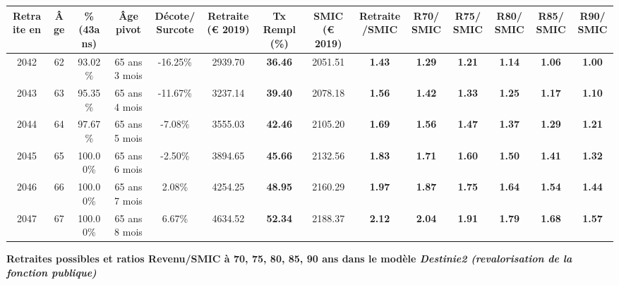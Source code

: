 \begin{adjustbox}{max width=\textwidth} 
\begin{tabular}[htb]{|c|c||c|c|c||c|c||c|c||c|c|c|c|c|} 
\hline 
 Retraite en &  Âge &  \%(43ans) &  Âge pivot &  Décote/Surcote &  Retraite (\euro{} 2019) &  Tx Rempl(\%) &  SMIC (\euro{} 2019) &  Retraite/SMIC &  R70/SMIC &  R75/SMIC &  R80/SMIC &  R85/SMIC &  R90/SMIC \\ 
\hline \hline 
 2042 &  62 &  93.02\% &  65 ans 3 mois &  -16.25\% &  2939.70 &  {\bf 36.46} &  2051.51 &  {\bf 1.43} &  {\bf 1.29} &  {\bf 1.21} &  {\bf 1.14} &  {\bf 1.06} &  {\bf {\color{red} 1.00}} \\ 
\hline 
 2043 &  63 &  95.35\% &  65 ans 4 mois &  -11.67\% &  3237.14 &  {\bf 39.40} &  2078.18 &  {\bf 1.56} &  {\bf 1.42} &  {\bf 1.33} &  {\bf 1.25} &  {\bf 1.17} &  {\bf 1.10} \\ 
\hline 
 2044 &  64 &  97.67\% &  65 ans 5 mois &  -7.08\% &  3555.03 &  {\bf 42.46} &  2105.20 &  {\bf 1.69} &  {\bf 1.56} &  {\bf 1.47} &  {\bf 1.37} &  {\bf 1.29} &  {\bf 1.21} \\ 
\hline 
 2045 &  65 &  100.00\% &  65 ans 6 mois &  -2.50\% &  3894.65 &  {\bf 45.66} &  2132.56 &  {\bf 1.83} &  {\bf 1.71} &  {\bf 1.60} &  {\bf 1.50} &  {\bf 1.41} &  {\bf 1.32} \\ 
\hline 
 2046 &  66 &  100.00\% &  65 ans 7 mois &  2.08\% &  4254.25 &  {\bf 48.95} &  2160.29 &  {\bf 1.97} &  {\bf 1.87} &  {\bf 1.75} &  {\bf 1.64} &  {\bf 1.54} &  {\bf 1.44} \\ 
\hline 
 2047 &  67 &  100.00\% &  65 ans 8 mois &  6.67\% &  4634.52 &  {\bf 52.34} &  2188.37 &  {\bf 2.12} &  {\bf 2.04} &  {\bf 1.91} &  {\bf 1.79} &  {\bf 1.68} &  {\bf 1.57} \\ 
\hline 
\hline 
\end{tabular} 
\end{adjustbox} 
 
 \vspace{0.1cm} 
{\bf \noindent Retraites possibles et ratios Revenu/SMIC à 70, 75, 80, 85, 90 ans dans le modèle \emph{Destinie2 (revalorisation de la fonction publique)}}  
 
